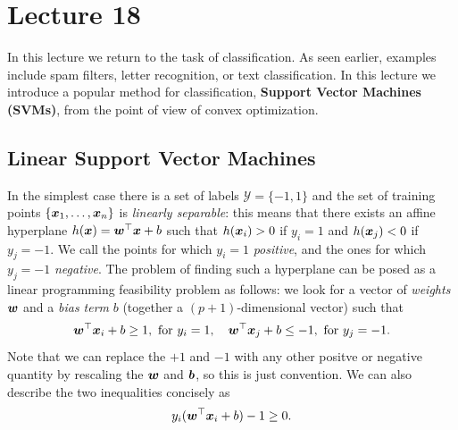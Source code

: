 %
%
% 


\chapter*{Lecture 18}
\setcounter{chapter}{18}
\setcounter{section}{0}
\setcounter{equation}{0}
\setcounter{theorem}{0}

In this lecture we return to the task of classification. As seen earlier, examples include spam filters, letter recognition, or text classification. In this lecture we introduce a popular method for classification, \textbf{Support Vector Machines (SVMs)}, from the point of view of convex optimization.

\section{Linear Support Vector Machines}
In the simplest case there is a set of labels $\mathcal{Y}=\{-1,1\}$ and the set of training points $\{\bm{x}_1,\dots,\bm{x}_n\}$ is {\em linearly separable}: this means that there exists an affine hyperplane $h(\bm{x})=\bm{w}^{\top}\bm{x}+b$ such that $h(\bm{x}_i)>0$ if $y_i=1$ and $h(\bm{x}_j)<0$ if $y_j=-1$. We call the points for which $y_i=1$ {\em positive}, and the ones for which $y_j=-1$ {\em negative}.
The problem of finding such a hyperplane can be posed as a linear programming feasibility problem as follows: we look for a vector of {\em weights} $\bm{w}$ and a {\em bias term} $b$ (together a $(p+1)$-dimensional vector) such that 
\begin{equation*}
  \bm{w}^{\top}\bm{x}_i+b\geq 1, \text{ for } y_i=1, \quad \bm{w}^{\top}\bm{x}_j+b\leq -1, \text{ for } y_j=-1.
\end{equation*}
Note that we can replace the $+1$ and $-1$ with any other positve or negative quantity by rescaling the $\bm{w}$ and $\bm{b}$, so this is just convention. We can also describe the two inequalities concisely as
\begin{equation}\label{eq:sephyp}
  y_i(\bm{w}^{\top}\bm{x}_i+b)-1 \geq 0.
\end{equation}

